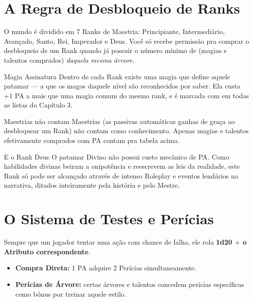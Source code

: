 \section{A Regra de Desbloqueio de Ranks}

O mundo é dividido em 7 Ranks de Maestria: Principiante, Intermediário, Avançado, Santo,
Rei, Imperador e Deus. Você só recebe permissão pra comprar o desbloqueio de um Rank
quando já possuir o número mínimo de  (magias e talentos comprados)
\emph{daquela mesma árvore}.



\begin{nota}{Magia Assinatura \assinatura}
    Dentro de cada Rank existe uma magia que define aquele patamar --- a que os magos
    daquele nível são reconhecidos por saber. Ela custa $+1$ PA a mais que uma magia comum
    do mesmo rank, e é marcada com \assinatura{} em todas as listas do Capítulo 3.
\end{nota}

\begin{nota}{Maestrias não contam}
    Maestrias (as passivas automáticas ganhas de graça ao desbloquear um Rank) não contam
    como conhecimento. Apenas magias e talentos efetivamente comprados com PA contam pra
    tabela acima.
\end{nota}

\begin{aviso}{E o Rank Deus}
    O patamar Divino não possui custo mecânico de PA. Como habilidades divinas beiram a
    onipotência e reescrevem as leis da realidade, este Rank só pode ser alcançado através
    de intenso Roleplay e eventos lendários na narrativa, ditados inteiramente pela
    história e pelo Mestre.
\end{aviso}

\section{O Sistema de Testes e Perícias}

Sempre que um jogador tentar uma ação com chance de falha, ele rola \textbf{1d20 $+$ o
Atributo correspondente}.

\begin{itemize}
    \item \textbf{Compra Direta:} 1 PA adquire 2 Perícias simultaneamente.
    \item \textbf{Perícias de Árvore:} certas árvores e talentos concedem perícias
          específicas como bônus por treinar aquele estilo.
\end{itemize}

